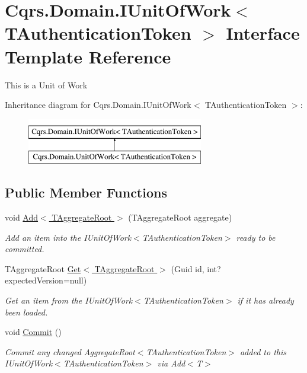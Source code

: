 \hypertarget{interfaceCqrs_1_1Domain_1_1IUnitOfWork}{}\section{Cqrs.\+Domain.\+I\+Unit\+Of\+Work$<$ T\+Authentication\+Token $>$ Interface Template Reference}
\label{interfaceCqrs_1_1Domain_1_1IUnitOfWork}


This is a Unit of Work  


Inheritance diagram for Cqrs.\+Domain.\+I\+Unit\+Of\+Work$<$ T\+Authentication\+Token $>$\+:\begin{figure}[H]
\begin{center}
\leavevmode
\includegraphics[height=2.000000cm]{interfaceCqrs_1_1Domain_1_1IUnitOfWork}
\end{center}
\end{figure}
\subsection*{Public Member Functions}
\begin{DoxyCompactItemize}
\item 
void \hyperlink{interfaceCqrs_1_1Domain_1_1IUnitOfWork_a786ebca85b4ef7294b98280230ef1397}{Add$<$ T\+Aggregate\+Root $>$} (T\+Aggregate\+Root aggregate)
\begin{DoxyCompactList}\small\item\em Add an item into the I\+Unit\+Of\+Work$<$\+T\+Authentication\+Token$>$ ready to be committed. \end{DoxyCompactList}\item 
T\+Aggregate\+Root \hyperlink{interfaceCqrs_1_1Domain_1_1IUnitOfWork_aad3e9f94cbe6941163feb9fe00ddbe06}{Get$<$ T\+Aggregate\+Root $>$} (Guid id, int? expected\+Version=null)
\begin{DoxyCompactList}\small\item\em Get an item from the I\+Unit\+Of\+Work$<$\+T\+Authentication\+Token$>$ if it has already been loaded. \end{DoxyCompactList}\item 
void \hyperlink{interfaceCqrs_1_1Domain_1_1IUnitOfWork_ade600c9bf9e8380c24eaf1e7e0df6e01}{Commit} ()
\begin{DoxyCompactList}\small\item\em Commit any changed Aggregate\+Root$<$\+T\+Authentication\+Token$>$ added to this I\+Unit\+Of\+Work$<$\+T\+Authentication\+Token$>$ via Add$<$\+T$>$ \end{DoxyCompactList}\end{DoxyCompactItemize}


